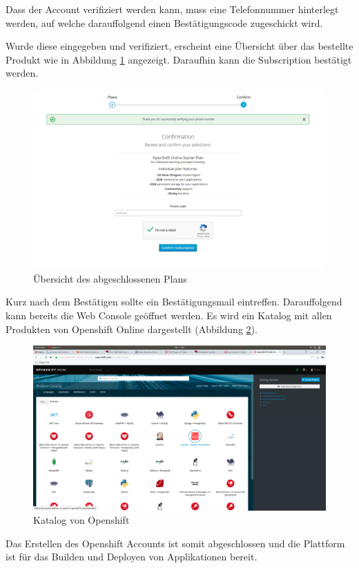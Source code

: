 \documentclass[12pt,a4paper]{article}
\begin{document}
Dass der Account verifiziert werden kann, muss eine Telefonnummer hinterlegt werden, auf welche darauffolgend einen Bestätigungscode zugeschickt wird. 

Wurde diese eingegeben und verifiziert, erscheint eine Übersicht über das bestellte Produkt wie in Abbildung \ref{fig:os-overview} angezeigt. Daraufhin kann die Subscription bestätigt werden.

\begin{figure}
	\centering
	\includegraphics[width=0.9\linewidth]{img/os-overview}
	\caption{Übersicht des abgeschlossenen Plans}
	\label{fig:os-overview}
\end{figure}
Kurz nach dem Bestätigen sollte ein Bestätigungsmail eintreffen. Darauffolgend kann bereits die Web Console geöffnet werden. Es wird ein Katalog mit allen Produkten von Openshift Online dargestellt (Abbildung \ref{fig:os-overview-catalog}).

\begin{figure}[h]
	\centering
	\includegraphics[width=0.7\linewidth]{img/os-overview-catalog}
	\caption{Katalog von Openshift}
	\label{fig:os-overview-catalog}
\end{figure}
Das Erstellen des Openshift Accounts ist somit abgeschlossen und die Platt\-form ist für das Builden und Deployen von Applikationen bereit. 
\end{document}
